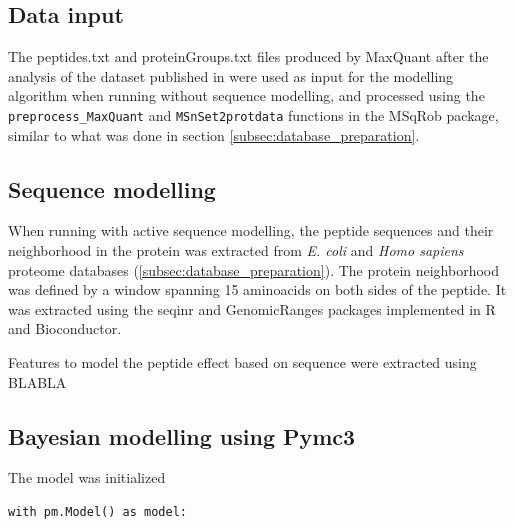 \documentclass[11pt, a4paper]{report}
\begin{document}
\subsection{Data input}
The peptides.txt and proteinGroups.txt files produced by MaxQuant \cite{Cox2008} after the analysis of the dataset published in \cite{Cox2014} were used as input for the modelling algorithm when running without sequence modelling, and processed using the \texttt{preprocess\_MaxQuant} and \texttt{MSnSet2protdata} functions in the MSqRob \cite{Goeminne2016} package, similar to what was done in section \ref{subsec:database_preparation}.

\subsection{Sequence modelling}

When running with active sequence modelling, the peptide sequences and their neighborhood in the protein was extracted from \textit{E. coli} and \textit{Homo sapiens} proteome databases (\ref{subsec:database_preparation}). The protein neighborhood was defined by a window spanning 15 aminoacids on both sides of the peptide. It was extracted using the seqinr \cite{Charif2007} and GenomicRanges \cite{Lawrence2013} packages implemented in R and Bioconductor.

Features to model the peptide effect based on sequence were extracted using BLABLA

\subsection{Bayesian modelling using Pymc3}

The model was initialized 

\begin{verbatim}
with pm.Model() as model:
\end{verbatim}
\end{document}
